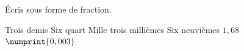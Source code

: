 %
%
Écris sous forme de fraction.
  \begin{tasks}
    \task Trois demis
    \task Six quart
    \task Mille trois millièmes
    \task Six neuvièmes
    \task $1,68$
    \task $\numprint{0,003}$
  \end{tasks}
